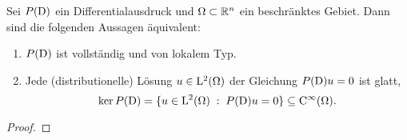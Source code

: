 %
%
%
%

\begin{thm}
Sei $P(\mathrm D)$ ein Differentialausdruck und $\Omega\subset\mathbb R^n$ ein beschränktes Gebiet. Dann sind die folgenden Aussagen äquivalent:
\begin{enumerate}
\item $P(\mathrm D)$ ist vollständig und von lokalem Typ.
\item Jede (distributionelle) Lösung $u\in\mathrm L^2(\Omega)$ der Gleichung $P(\mathrm D)u=0$ ist glatt,
\begin{equation}
    \ker P(\mathrm D) = \{ u\in\mathrm L^2(\Omega) \;:\; P(\mathrm D)u=0\} \subseteq\mathrm C^\infty(\Omega).
\end{equation}
\end{enumerate}
\end{thm}
\begin{proof}
\end{proof}